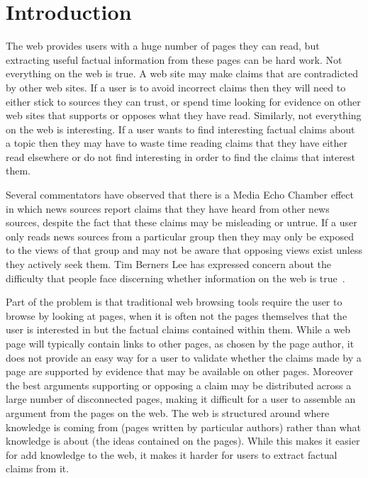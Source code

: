 \documentclass{chi2009}
\begin{document}
\section{Introduction}

The web provides users with a huge number of pages they can read, but extracting useful factual information from these pages can be hard work. Not everything on the web is true. A web site may make claims that are contradicted by other web sites. If a user is to avoid incorrect claims then they will need to either stick to sources they can trust, or spend time looking for evidence on other web sites that supports or opposes what they have read. Similarly, not everything on the web is interesting. If a user wants to find interesting factual claims about a topic then they may have to waste time reading claims that they have either read elsewhere or do not find interesting in order to find the claims that interest them.

Several commentators have observed that there is a Media Echo Chamber effect~\cite{echochamber,echochamber2} in which news sources report claims that they have heard from other news sources, despite the fact that these claims may be misleading or untrue. If a user only reads news sources from a particular group then they may only be exposed to the views of that group and may not be aware that opposing views exist unless they actively seek them. Tim Berners Lee has expressed concern about the difficulty that people face discerning whether information on the web is true~\cite{bbcwebwarning}.

Part of the problem is that traditional web browsing tools require the user to browse by looking at pages, when it is often not the pages themselves that the user is interested in but the factual claims contained within them. While a web page will typically contain links to other pages, as chosen by the page author, it does not provide an easy way for a user to validate whether the claims made by a page are supported by evidence that may be available on other pages. Moreover the best arguments supporting or opposing a claim may be distributed across a large number of disconnected pages, making it difficult for a user to assemble an argument from the pages on the web. The web is structured around where knowledge is coming from (pages written by particular authors) rather than what knowledge is about (the ideas contained on the pages). While this makes it easier for add knowledge to the web, it makes it harder for users to extract factual claims from it.
\end{document}
